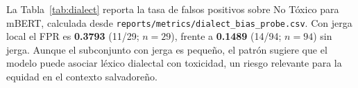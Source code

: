 La Tabla~\ref{tab:dialect} reporta la tasa de falsos positivos sobre No Tóxico para mBERT, calculada desde \texttt{reports/metrics/dialect\_bias\_probe.csv}.
Con jerga local el FPR es \textbf{0.3793} (11/29; $n=29$), frente a \textbf{0.1489} (14/94; $n=94$) sin jerga.
Aunque el subconjunto con jerga es pequeño, el patrón sugiere que el modelo puede asociar léxico dialectal con toxicidad, un riesgo relevante para la equidad en el contexto salvadoreño.
